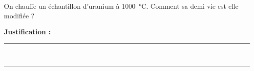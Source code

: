 On chauffe un échantillon d'uranium à \qty{1000}{\degreeCelsius}. Comment sa demi-vie est-elle modifiée ?

\choices

\noindent\textbf{Justification :} \hrulefill \\[2.5ex]
\rule{\linewidth}{0.4pt} \\[2.5ex]
\rule{\linewidth}{0.4pt}
\vfill
